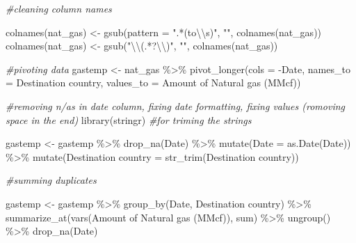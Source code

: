 \documentclass[
]{article}
\newenvironment{Shaded}{\begin{snugshade}}{\end{snugshade}}
\newcommand{\AttributeTok}[1]{\textcolor[rgb]{0.77,0.63,0.00}{#1}}
\newcommand{\CommentTok}[1]{\textcolor[rgb]{0.56,0.35,0.01}{\textit{#1}}}
\newcommand{\FunctionTok}[1]{\textcolor[rgb]{0.00,0.00,0.00}{#1}}
\newcommand{\NormalTok}[1]{#1}
\newcommand{\OtherTok}[1]{\textcolor[rgb]{0.56,0.35,0.01}{#1}}
\newcommand{\SpecialCharTok}[1]{\textcolor[rgb]{0.00,0.00,0.00}{#1}}
\newcommand{\StringTok}[1]{\textcolor[rgb]{0.31,0.60,0.02}{#1}}
\begin{document}
\begin{Shaded}
\begin{Highlighting}[]
\CommentTok{\#cleaning column names}

\FunctionTok{colnames}\NormalTok{(nat\_gas) }\OtherTok{\textless{}{-}} \FunctionTok{gsub}\NormalTok{(}\AttributeTok{pattern =} \StringTok{".*(to}\SpecialCharTok{\textbackslash{}\textbackslash{}}\StringTok{s)"}\NormalTok{, }\StringTok{""}\NormalTok{, }\FunctionTok{colnames}\NormalTok{(nat\_gas))}
\FunctionTok{colnames}\NormalTok{(nat\_gas) }\OtherTok{\textless{}{-}} \FunctionTok{gsub}\NormalTok{(}\StringTok{"}\SpecialCharTok{\textbackslash{}\textbackslash{}}\StringTok{(.*?}\SpecialCharTok{\textbackslash{}\textbackslash{}}\StringTok{)"}\NormalTok{, }\StringTok{""}\NormalTok{, }\FunctionTok{colnames}\NormalTok{(nat\_gas))}

\CommentTok{\#pivoting data}
\NormalTok{gastemp }\OtherTok{\textless{}{-}}\NormalTok{ nat\_gas }\SpecialCharTok{\%\textgreater{}\%} 
  \FunctionTok{pivot\_longer}\NormalTok{(}\AttributeTok{cols =} \SpecialCharTok{{-}}\NormalTok{Date,}
               \AttributeTok{names\_to =} \StringTok{\textquotesingle{}Destination country\textquotesingle{}}\NormalTok{,}
               \AttributeTok{values\_to =} \StringTok{\textquotesingle{}Amount of Natural gas (MMcf)\textquotesingle{}}\NormalTok{)}

\CommentTok{\#removing n/as in date column, fixing date formatting, fixing values (romoving space in the end)}
\FunctionTok{library}\NormalTok{(stringr) }\CommentTok{\#for triming the strings}

\NormalTok{gastemp }\OtherTok{\textless{}{-}}\NormalTok{ gastemp }\SpecialCharTok{\%\textgreater{}\%} 
  \FunctionTok{drop\_na}\NormalTok{(Date) }\SpecialCharTok{\%\textgreater{}\%} 
  \FunctionTok{mutate}\NormalTok{(}\AttributeTok{Date =} \FunctionTok{as.Date}\NormalTok{(Date)) }\SpecialCharTok{\%\textgreater{}\%} 
  \FunctionTok{mutate}\NormalTok{(}\StringTok{\textasciigrave{}}\AttributeTok{Destination country}\StringTok{\textasciigrave{}} \OtherTok{=} \FunctionTok{str\_trim}\NormalTok{(}\StringTok{\textasciigrave{}}\AttributeTok{Destination country}\StringTok{\textasciigrave{}}\NormalTok{))}


\CommentTok{\#summing duplicates }

\NormalTok{gastemp }\OtherTok{\textless{}{-}}\NormalTok{ gastemp }\SpecialCharTok{\%\textgreater{}\%}
  \FunctionTok{group\_by}\NormalTok{(Date, }\StringTok{\textasciigrave{}}\AttributeTok{Destination country}\StringTok{\textasciigrave{}}\NormalTok{) }\SpecialCharTok{\%\textgreater{}\%}
  \FunctionTok{summarize\_at}\NormalTok{(}\FunctionTok{vars}\NormalTok{(}\StringTok{\textasciigrave{}}\AttributeTok{Amount of Natural gas (MMcf)}\StringTok{\textasciigrave{}}\NormalTok{), sum) }\SpecialCharTok{\%\textgreater{}\%}
  \FunctionTok{ungroup}\NormalTok{() }\SpecialCharTok{\%\textgreater{}\%} 
  \FunctionTok{drop\_na}\NormalTok{(Date)}


\end{Highlighting}
\end{Shaded}
\end{document}
